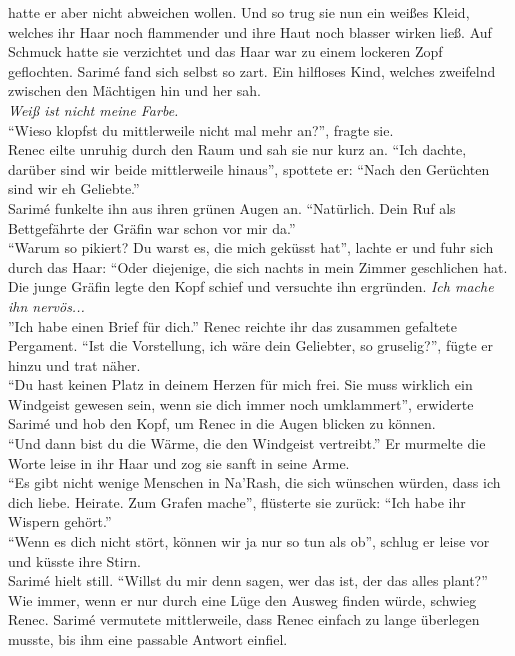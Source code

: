 hatte er aber nicht abweichen wollen. Und so trug sie nun ein weißes Kleid, welches ihr Haar noch 
flammender und ihre Haut noch blasser wirken ließ. Auf Schmuck hatte sie verzichtet und das Haar 
war zu einem lockeren Zopf geflochten. Sarimé fand sich selbst so zart. Ein hilfloses Kind, welches 
zweifelnd zwischen den Mächtigen hin und her sah.\\
\textit{Weiß ist nicht meine Farbe.}\\
``Wieso klopfst du mittlerweile nicht mal mehr an?'', fragte sie.\\
Renec eilte unruhig durch den Raum und sah sie nur kurz an. ``Ich dachte, darüber sind wir beide 
mittlerweile hinaus'', spottete er: ``Nach den Gerüchten sind wir eh Geliebte.''\\
Sarimé funkelte ihn aus ihren grünen Augen an. ``Natürlich. Dein Ruf als Bettgefährte der Gräfin 
war schon vor mir da.''\\
``Warum so pikiert? Du warst es, die mich geküsst hat'', lachte er und fuhr sich durch das Haar: 
``Oder diejenige, die sich nachts in mein Zimmer geschlichen hat.\\
Die junge Gräfin legte den Kopf schief und versuchte ihn ergründen. \textit{Ich mache ihn 
nervös...}\\
''Ich habe einen Brief für dich.'' Renec reichte ihr das zusammen gefaltete Pergament. ``Ist die 
Vorstellung, ich wäre dein Geliebter, so gruselig?'', fügte er hinzu und trat näher.\\
``Du hast keinen Platz in deinem Herzen für mich frei. Sie muss wirklich ein Windgeist gewesen 
sein, wenn sie dich immer noch umklammert'', erwiderte Sarimé und hob den Kopf, um Renec in die 
Augen blicken zu können.\\
``Und dann bist du die Wärme, die den Windgeist vertreibt.'' Er murmelte die Worte leise in ihr 
Haar und zog sie sanft in seine Arme.\\
``Es gibt nicht wenige Menschen in Na'Rash, die sich wünschen würden, dass ich dich liebe. Heirate. 
Zum Grafen mache'', flüsterte sie zurück: ``Ich habe ihr Wispern gehört.''\\
``Wenn es dich nicht stört, können wir ja nur so tun als ob'', schlug er leise vor und küsste ihre 
Stirn.\\
Sarimé hielt still. ``Willst du mir denn sagen, wer das ist, der das alles plant?''
Wie immer, wenn er nur durch eine Lüge den Ausweg finden würde, schwieg Renec. Sarimé vermutete 
mittlerweile, dass Renec einfach zu lange überlegen musste, bis ihm eine passable Antwort einfiel. 
